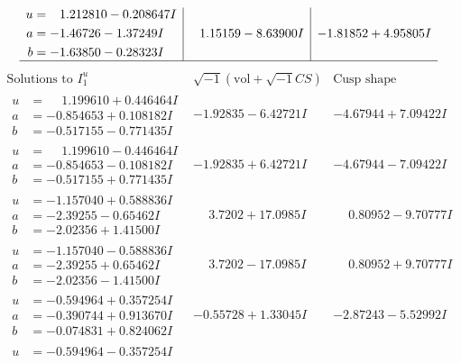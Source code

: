 \documentclass[1p]{elsarticle_modified}
\theoremstyle{definition}
\newcommand{\I}{\sqrt{-1}}
\begin{document}
$$\begin{array}{c|c|c}
\begin{aligned}
u &= \phantom{-}1.212810 - 0.208647 I \\
a &= -1.46726 - 1.37249 I \\
b &= -1.63850 - 0.28323 I\end{aligned}
 & \phantom{-}1.15159 - 8.63900 I & -1.81852 + 4.95805 I\\
 \hline 
 \end{array}$$\newpage$$\begin{array}{c|c|c}  
\text{Solutions to }I^u_{1}& \I (\text{vol} + \sqrt{-1}CS) & \text{Cusp shape}\\
 \hline 
\begin{aligned}
u &= \phantom{-}1.199610 + 0.446464 I \\
a &= -0.854653 + 0.108182 I \\
b &= -0.517155 - 0.771435 I\end{aligned}
 & -1.92835 - 6.42721 I & -4.67944 + 7.09422 I \\ \hline\begin{aligned}
u &= \phantom{-}1.199610 - 0.446464 I \\
a &= -0.854653 - 0.108182 I \\
b &= -0.517155 + 0.771435 I\end{aligned}
 & -1.92835 + 6.42721 I & -4.67944 - 7.09422 I \\ \hline\begin{aligned}
u &= -1.157040 + 0.588836 I \\
a &= -2.39255 - 0.65462 I \\
b &= -2.02356 + 1.41500 I\end{aligned}
 & \phantom{-}3.7202 + 17.0985 I & \phantom{-}0.80952 - 9.70777 I \\ \hline\begin{aligned}
u &= -1.157040 - 0.588836 I \\
a &= -2.39255 + 0.65462 I \\
b &= -2.02356 - 1.41500 I\end{aligned}
 & \phantom{-}3.7202 - 17.0985 I & \phantom{-}0.80952 + 9.70777 I \\ \hline\begin{aligned}
u &= -0.594964 + 0.357254 I \\
a &= -0.390744 + 0.913670 I \\
b &= -0.074831 + 0.824062 I\end{aligned}
 & -0.55728 + 1.33045 I & -2.87243 - 5.52992 I \\ \hline\begin{aligned}
u &= -0.594964 - 0.357254 I \\

\end{aligned}
\end{array}$$
\end{document}
